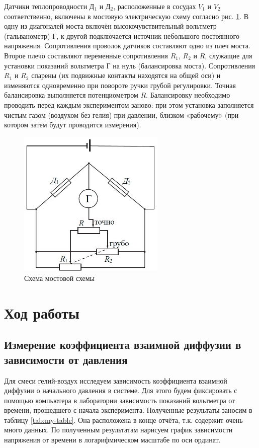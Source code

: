 \documentclass[a4paper,12pt]{article} %
\begin{document}
Датчики теплопроводности Д$ _1 $ и Д$ _2 $, расположенные в сосудах $ V_1 $ и $ V_2 $ соответственно, включены в мостовую электрическую схему согласно рис. \ref{ris5}. В одну из диагоналей моста включён высокочувствительный вольтметр (гальванометр) Г, к другой подключается источник небольшого постоянного напряжения. Сопротивления проволок датчиков составляют одно из плеч моста. Второе плечо составляют переменные сопротивления $ R_1 $, $ R_2 $ и $ R $, служащие для установки показаний вольтметра Г на нуль (балансировка моста). Сопротивления $ R_1 $ и $ R_2 $ спарены (их подвижные контакты находятся на общей оси) и изменяются одновременно при повороте ручки грубой регулировки. Точная балансировка выполняется потенциометром $ R $. Балансировку необходимо проводить перед каждым экспериментом заново: при этом установка заполняется чистым газом (воздухом без гелия) при давлении, близком «рабочему» (при котором затем будут проводится измерения).

\begin{figure}[H]
	\begin{center}
		\includegraphics[width=7cm]{ris5.jpg}
	\end{center}
	\caption{Схема мостовой схемы}
	\label{ris5}
\end{figure}

\section{Ход работы}

\subsection{Измерение коэффициента взаимной диффузии в зависимости от давления}

Для смеси гелий-воздух исследуем зависимость коэффициента взаимной диффузии о начального давления в системе. Для этого будем фиксировать с помощью компьютера в лаборатории зависимость показаний вольтметра от времени, прошедшего с начала эксперимента. Полученные результаты заносим в таблицу \ref{tab:my-table}. Она расположена в конце отчёта, т.к. содержит очень много данных. По полученным результатам нарисуем график зависимости напряжения от времени в логарифмическом масштабе по оси ординат.
\end{document}
